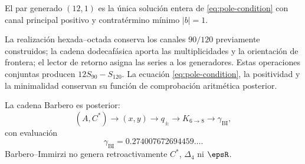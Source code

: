 \begin{proposition}
El par generado \((12,1)\) es la única solución entera de
\eqref{eq:pole-condition} con canal principal positivo y contratérmino
mínimo \(|b|=1\).
\end{proposition}

La realización hexada--octada conserva los canales \(90/120\)
previamente construidos; la cadena dodecafásica aporta las multiplicidades
y la orientación de frontera; el lector de retorno asigna las series a los
generadores. Estas operaciones conjuntas producen \(12S_{90}-S_{120}\).
La ecuación \eqref{eq:pole-condition}, la positividad y la minimalidad
conservan su función de comprobación aritmética posterior.

La cadena Barbero es posterior:
\[
(A,C^*)\to(x,y)\to q_\pm
\to K_{6\to8}\to\gamma_{\mathrm{BI}},
\]
con evaluación
\[
\gamma_{\mathrm{BI}}=0.274007672694459\ldots.
\]
Barbero--Immirzi no genera retroactivamente \(C^*\), \(\Delta_4\) ni
\(\epsR\).


